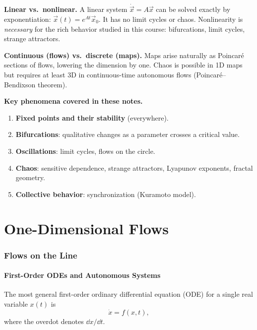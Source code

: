 \documentclass[11pt,letterpaper]{article}
\theoremstyle{definition}
\theoremstyle{plain}
\theoremstyle{remark}
\newcommand{\xdot}{\dot{x}}
\begin{document}
\medskip\noindent\textbf{Linear vs.\ nonlinear.}  A linear system
$\dot{\vec{x}}=A\vec{x}$ can be solved exactly by exponentiation:
$\vec{x}(t)=e^{At}\vec{x}_0$.  It has no limit cycles or chaos.
Nonlinearity is \emph{necessary} for the rich behavior studied in
this course: bifurcations, limit cycles, strange attractors.

\medskip\noindent\textbf{Continuous (flows) vs.\ discrete (maps).}
Maps arise naturally as Poincar\'e sections of flows, lowering the
dimension by one.  Chaos is possible in 1D maps but requires at
least 3D in continuous-time autonomous flows
(Poincar\'e--Bendixson theorem).

\medskip\noindent\textbf{Key phenomena covered in these notes.}
\begin{enumerate}[leftmargin=2em]
  \item \textbf{Fixed points and their stability} (everywhere).
  \item \textbf{Bifurcations}: qualitative changes as a parameter crosses
    a critical value.
  \item \textbf{Oscillations}: limit cycles, flows on the circle.
  \item \textbf{Chaos}: sensitive dependence, strange attractors,
    Lyapunov exponents, fractal geometry.
  \item \textbf{Collective behavior}: synchronization (Kuramoto model).
\end{enumerate}

\newpage

\part{One-Dimensional Flows}

\section{Flows on the Line}\label{sec:flows-line}

\subsection{First-Order ODEs and Autonomous Systems}

The most general first-order ordinary differential equation (ODE) for a single
real variable $x(t)$ is
\begin{equation}\label{eq:general-1st}
  \xdot = f(x,t),
\end{equation}
where the overdot denotes $\dd{x}/\dd{t}$.
\end{document}
